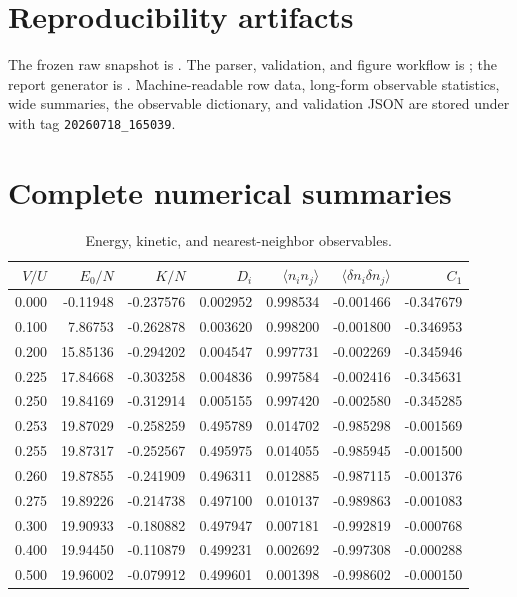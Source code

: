\documentclass[10pt]{article}
\begin{document}
\section*{Reproducibility artifacts}
The frozen raw snapshot is
.  The parser, validation, and figure workflow is
; the report generator is
.  Machine-readable row data, long-form
observable statistics, wide summaries, the observable dictionary, and validation
JSON are stored under  with tag \texttt{20260718\_165039}.

\appendix
\section{Complete numerical summaries}

\begin{table}[!htbp]
\centering\scriptsize
\caption{Energy, kinetic, and nearest-neighbor observables.}
\begin{tabular}{rrrrrrr}
\toprule
$V/U$ & $E_0/N$ & $K/N$ & $D_i$ & $\langle n_i n_j\rangle$ &
$\langle\delta n_i\delta n_j\rangle$ & $C_1$\\
\midrule
0.000 & -0.11948 & -0.237576 & 0.002952 & 0.998534 & -0.001466 & -0.347679 \\
0.100 & 7.86753 & -0.262878 & 0.003620 & 0.998200 & -0.001800 & -0.346953 \\
0.200 & 15.85136 & -0.294202 & 0.004547 & 0.997731 & -0.002269 & -0.345946 \\
0.225 & 17.84668 & -0.303258 & 0.004836 & 0.997584 & -0.002416 & -0.345631 \\
0.250 & 19.84169 & -0.312914 & 0.005155 & 0.997420 & -0.002580 & -0.345285 \\
0.253 & 19.87029 & -0.258259 & 0.495789 & 0.014702 & -0.985298 & -0.001569 \\
0.255 & 19.87317 & -0.252567 & 0.495975 & 0.014055 & -0.985945 & -0.001500 \\
0.260 & 19.87855 & -0.241909 & 0.496311 & 0.012885 & -0.987115 & -0.001376 \\
0.275 & 19.89226 & -0.214738 & 0.497100 & 0.010137 & -0.989863 & -0.001083 \\
0.300 & 19.90933 & -0.180882 & 0.497947 & 0.007181 & -0.992819 & -0.000768 \\
0.400 & 19.94450 & -0.110879 & 0.499231 & 0.002692 & -0.997308 & -0.000288 \\
0.500 & 19.96002 & -0.079912 & 0.499601 & 0.001398 & -0.998602 & -0.000150 \\
\bottomrule
\end{tabular}
\end{table}
\end{document}
